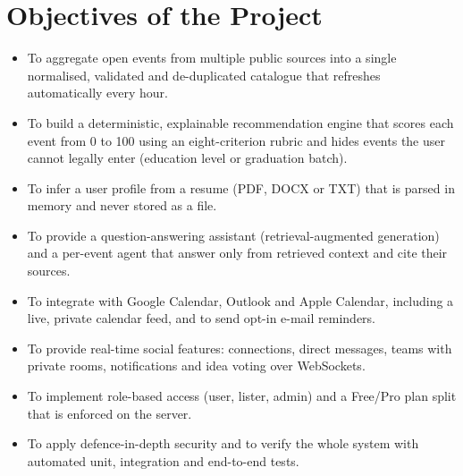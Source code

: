 \documentclass[12pt,a4paper]{report}
\begin{document}
\section{Objectives of the Project}
\begin{itemize}[leftmargin=*]
    \item To aggregate open events from multiple public sources into a single normalised, validated and de-duplicated catalogue that refreshes automatically every hour.
    \item To build a deterministic, explainable recommendation engine that scores each event from 0 to 100 using an eight-criterion rubric and hides events the user cannot legally enter (education level or graduation batch).
    \item To infer a user profile from a resume (PDF, DOCX or TXT) that is parsed in memory and never stored as a file.
    \item To provide a question-answering assistant (retrieval-augmented generation) and a per-event agent that answer only from retrieved context and cite their sources.
    \item To integrate with Google Calendar, Outlook and Apple Calendar, including a live, private calendar feed, and to send opt-in e-mail reminders.
    \item To provide real-time social features: connections, direct messages, teams with private rooms, notifications and idea voting over WebSockets.
    \item To implement role-based access (user, lister, admin) and a Free/Pro plan split that is enforced on the server.
    \item To apply defence-in-depth security and to verify the whole system with automated unit, integration and end-to-end tests.
\end{itemize}
\end{document}
